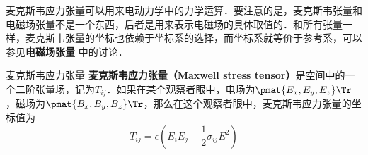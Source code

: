 

麦克斯韦应力张量可以用来电动力学中的力学运算．要注意的是，麦克斯韦张量和电磁场张量不是一个东西，后者是用来表示电磁场的具体取值的．和所有张量一样，麦克斯韦张量的坐标也依赖于坐标系的选择，而坐标系就等价于参考系，可以参见\textbf{电磁场张量} 中的讨论．

\begin{definition}{麦克斯韦应力张量}
\textbf{麦克斯韦应力张量（Maxwell stress tensor）}是空间中的一个二阶张量场，记为$T_{ij}$．如果在某个观察者眼中，电场为$\pmat{E_x, E_y, E_z}\Tr$，磁场为$\pmat{B_x, B_y, B_z}\Tr$，那么在这个观察者眼中，麦克斯韦应力张量的坐标值为
\begin{equation}
T_{ij}=\epsilon(E_iE_j-\frac{1}{2}\sigma_{ij}E^2)
\end{equation}
\end{definition}







